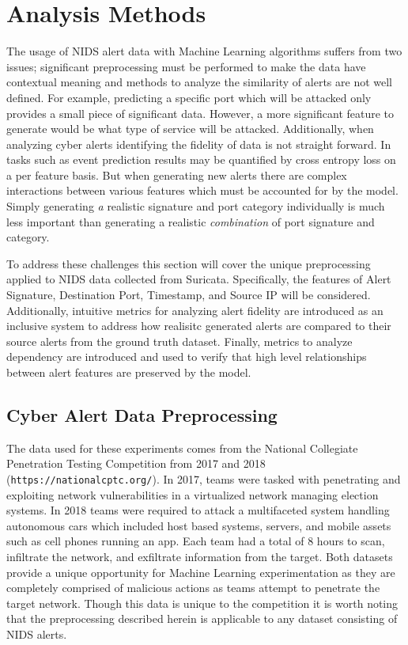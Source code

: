 \chapter{Analysis Methods}


The usage of NIDS alert data with Machine Learning algorithms suffers from two issues; significant preprocessing must be performed to make the data have contextual meaning and methods to analyze the similarity of alerts are not well defined. For example, predicting a specific port which will be attacked only provides a small piece of significant data. However, a more significant feature to generate would be what type of service will be attacked. Additionally, when analyzing cyber alerts identifying the fidelity of data is not straight forward. In tasks such as event prediction results may be quantified by cross entropy loss on a per feature basis. But when generating new alerts there are complex interactions between various features which must be accounted for by the model. Simply generating \emph{a} realistic signature and port category individually is much less important than generating a realistic \emph{combination} of port signature and category. 

To address these challenges this section will cover the unique preprocessing applied to NIDS data collected from Suricata. Specifically, the features of Alert Signature, Destination Port, Timestamp, and Source IP will be considered. Additionally, intuitive metrics for analyzing alert fidelity are introduced as an inclusive system to address how realisitc generated alerts are compared to their source alerts from the ground truth dataset. Finally, metrics to analyze dependency are introduced and used to verify that high level relationships between alert features are preserved by the model.


\section{Cyber Alert Data Preprocessing}
\label{sec:preproc}

The data used for these experiments comes from the National Collegiate Penetration Testing Competition from 2017 and 2018 (\texttt{https://nationalcptc.org/}). In 2017, teams were tasked with penetrating and exploiting network vulnerabilities in a virtualized network managing election systems. In 2018 teams were required to attack a multifaceted system handling autonomous cars which included host based systems, servers, and mobile assets such as cell phones running an app. Each team had a total of 8 hours to scan, infiltrate the network, and exfiltrate information from the target. Both datasets provide a unique opportunity for Machine Learning experimentation as they are completely comprised of malicious actions as teams attempt to penetrate the target network. Though this data is unique to the competition it is worth noting that the preprocessing described herein is applicable to any dataset consisting of NIDS alerts.  

